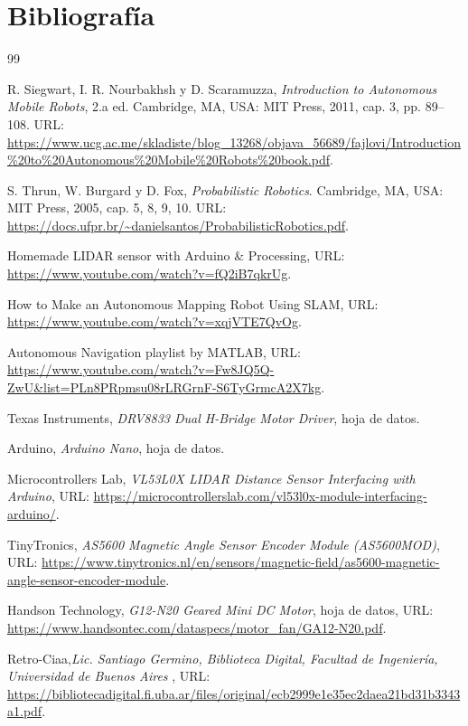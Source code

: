 \documentclass[12pt,a4paper]{article}
\begin{document}
\section{Bibliografía}

\begin{thebibliography}{99}

R. Siegwart, I. R. Nourbakhsh y D. Scaramuzza,
\textit{Introduction to Autonomous Mobile Robots}, 2.a ed.
Cambridge, MA, USA: MIT Press, 2011, cap. 3, pp. 89--108.
URL: \url{https://www.ucg.ac.me/skladiste/blog_13268/objava_56689/fajlovi/Introduction%20to%20Autonomous%20Mobile%20Robots%20book.pdf}.

S. Thrun, W. Burgard y D. Fox,
\textit{Probabilistic Robotics}.
Cambridge, MA, USA: MIT Press, 2005, cap. 5, 8, 9, 10.
URL: \url{https://docs.ufpr.br/~danielsantos/ProbabilisticRobotics.pdf}.

Homemade LIDAR sensor with Arduino \& Processing,
URL: \url{https://www.youtube.com/watch?v=fQ2iB7qkrUg}.

How to Make an Autonomous Mapping Robot Using SLAM,
URL: \url{https://www.youtube.com/watch?v=xqjVTE7QvOg}.

Autonomous Navigation playlist by MATLAB,
URL: \url{https://www.youtube.com/watch?v=Fw8JQ5Q-ZwU&list=PLn8PRpmsu08rLRGrnF-S6TyGrmcA2X7kg}.

Texas Instruments, \textit{DRV8833 Dual H-Bridge Motor Driver}, hoja de datos.

Arduino, \textit{Arduino Nano}, hoja de datos.

Microcontrollers Lab, \textit{VL53L0X LIDAR Distance Sensor Interfacing with Arduino}, URL: \url{https://microcontrollerslab.com/vl53l0x-module-interfacing-arduino/}.

TinyTronics, \textit{AS5600 Magnetic Angle Sensor Encoder Module (AS5600MOD)}, URL: \url{https://www.tinytronics.nl/en/sensors/magnetic-field/as5600-magnetic-angle-sensor-encoder-module}.

Handson Technology, \textit{G12-N20 Geared Mini DC Motor}, hoja de datos, URL: \url{https://www.handsontec.com/dataspecs/motor_fan/GA12-N20.pdf}.

Retro-Ciaa,\textit{Lic. Santiago Germino, Biblioteca Digital, Facultad de Ingeniería, Universidad de Buenos Aires} , URL: \url{https://bibliotecadigital.fi.uba.ar/files/original/ecb2999e1e35ec2daea21bd31b3343a1.pdf}.


\end{thebibliography}
\end{document}

